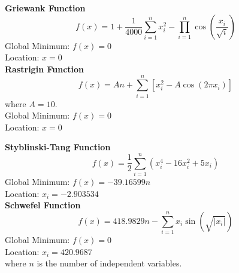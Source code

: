 \documentclass[paper,revised]{geophysics}
\begin{document}
{\bf{Griewank Function}}
\begin{equation}
	f(x) = 1 + \frac{1}{4000} \sum_{i=1}^{n} x_i^2 - \prod_{i=1}^{n} \cos\left(\frac{x_i}{\sqrt{i}}\right)
\end{equation}
Global Minimum: \(f(x)=0\)\\
Location: \(x=0\)\\

{\bf{Rastrigin Function}}
\begin{equation}
	f(x) = A n + \sum_{i=1}^{n} \left[ x_i^2 - A \cos(2 \pi x_i) \right]
\end{equation}
where \( A = 10 \).\\
Global Minimum: \(f(x)=0\)\\
Location: \(x=0\)

{\bf{Styblinski-Tang Function}}
\begin{equation}
	f(x) = \frac{1}{2} \sum_{i=1}^{n} \left( x_i^4 - 16x_i^2 + 5x_i \right)
\end{equation}
Global Minimum: \(f(x) = -39.16599n\)\\
Location: \(x_i = -2.903534\)\\

{\bf{Schwefel Function}}
\begin{equation}
	f(x) = 418.9829n - \sum_{i=1}^{n} x_i \sin(\sqrt{|x_i|})
\end{equation}
Global Minimum: \(f(x) = 0\)\\
Location: \(x_i = 420.9687\)\\
where \(n\) is the number of independent variables.
%


%


%

\newpage


\end{document}
